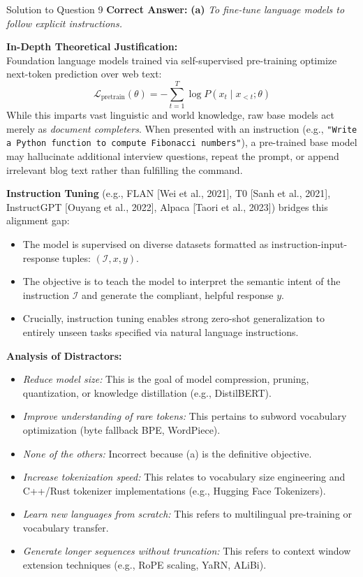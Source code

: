 \documentclass[11pt,a4paper]{article}
\begin{document}
\bigskip

\begin{solutionbox}{Solution to Question 9}
\textbf{Correct Answer:} \textbf{(a)} \textit{To fine-tune language models to follow explicit instructions.}

\medskip
\textbf{In-Depth Theoretical Justification:}\\
Foundation language models trained via self-supervised pre-training optimize next-token prediction over web text:
\[
\mathcal{L}_{\text{pretrain}}(\theta) = -\sum_{t=1}^T \log P(x_t \mid x_{<t}; \theta)
\]
While this imparts vast linguistic and world knowledge, raw base models act merely as \textit{document completers}. When presented with an instruction (e.g., \texttt{"Write a Python function to compute Fibonacci numbers"}), a pre-trained base model may hallucinate additional interview questions, repeat the prompt, or append irrelevant blog text rather than fulfilling the command.

\textbf{Instruction Tuning} (e.g., FLAN [Wei et al., 2021], T0 [Sanh et al., 2021], InstructGPT [Ouyang et al., 2022], Alpaca [Taori et al., 2023]) bridges this alignment gap:
\begin{itemize}
    \item The model is supervised on diverse datasets formatted as instruction-input-response tuples: $(\mathcal{I}, x, y)$.
    \item The objective is to teach the model to interpret the semantic intent of the instruction $\mathcal{I}$ and generate the compliant, helpful response $y$.
    \item Crucially, instruction tuning enables strong zero-shot generalization to entirely unseen tasks specified via natural language instructions.
\end{itemize}

\medskip
\textbf{Analysis of Distractors:}
\begin{itemize}[leftmargin=1.5cm]
    \item[\textbf{(b)}] \textit{Reduce model size:} This is the goal of model compression, pruning, quantization, or knowledge distillation (e.g., DistilBERT).
    \item[\textbf{(c)}] \textit{Improve understanding of rare tokens:} This pertains to subword vocabulary optimization (byte fallback BPE, WordPiece).
    \item[\textbf{(d)}] \textit{None of the others:} Incorrect because (a) is the definitive objective.
    \item[\textbf{(e)}] \textit{Increase tokenization speed:} This relates to vocabulary size engineering and C++/Rust tokenizer implementations (e.g., Hugging Face Tokenizers).
    \item[\textbf{(f)}] \textit{Learn new languages from scratch:} This refers to multilingual pre-training or vocabulary transfer.
    \item[\textbf{(g)}] \textit{Generate longer sequences without truncation:} This refers to context window extension techniques (e.g., RoPE scaling, YaRN, ALiBi).
\end{itemize}
\end{solutionbox}
\end{document}
